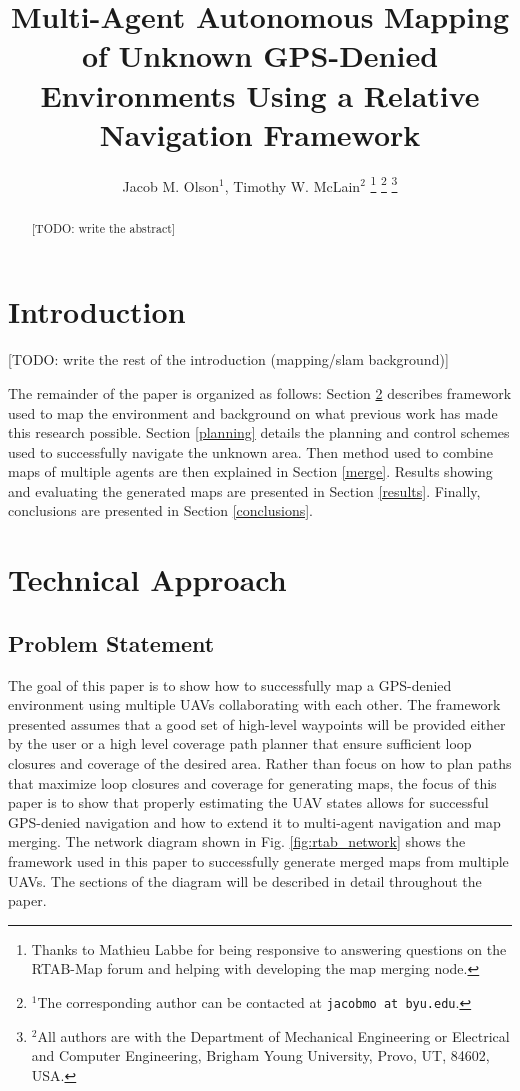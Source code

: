 \documentclass[letterpaper, 10 pt, conference]{ieeeconf}  %
\title{\LARGE \bf
Multi-Agent Autonomous Mapping of Unknown GPS-Denied Environments Using a Relative Navigation Framework}
\author{Jacob M. Olson$^{1}$, Timothy W. McLain$^{2}$%
\thanks{Thanks to Mathieu Labbe for being responsive to answering questions on the RTAB-Map forum and helping with developing the map merging node.}%
\thanks{$^{1}$The corresponding author can be contacted at
        {\tt\small jacobmo at byu.edu}.}%
\thanks{$^{2}$All authors are with the Department of Mechanical Engineering or Electrical and Computer Engineering,
        Brigham Young University, Provo, UT, 84602, USA.}%
}
\newcommand{\todo}[1]{{\color{blue}[TODO: #1]}}
\begin{document}
\maketitle
\thispagestyle{empty}
\pagestyle{empty}


\begin{abstract}

\todo{write the abstract}

\end{abstract}


\section{Introduction}

\todo{write the rest of the introduction (mapping/slam background)}

The remainder of the paper is organized as follows: Section \ref{approach} describes framework used to map the environment and background on what previous work has made this research possible. Section \ref{planning} details the planning and control schemes used to successfully navigate the unknown area. Then method used to combine maps of multiple agents are then explained in Section \ref{merge}. Results showing and evaluating the generated maps are presented in Section \ref{results}. Finally, conclusions are presented in Section \ref{conclusions}.

\section{Technical Approach}\label{approach}

\subsection{Problem Statement}

The goal of this paper is to show how to successfully map a GPS-denied environment using multiple UAVs collaborating with each other. The framework presented assumes that a good set of high-level waypoints will be provided either by the user or a high level coverage path planner that ensure sufficient loop closures and coverage of the desired area. Rather than focus on how to plan paths that maximize loop closures and coverage for generating maps, the focus of this paper is to show that properly estimating the UAV states allows for successful GPS-denied navigation and how to extend it to multi-agent navigation and map merging. The network diagram shown in Fig. \ref{fig:rtab_network} shows the framework used in this paper to successfully generate merged maps from multiple UAVs. The sections of the diagram will be described in detail throughout the paper.
\end{document}
